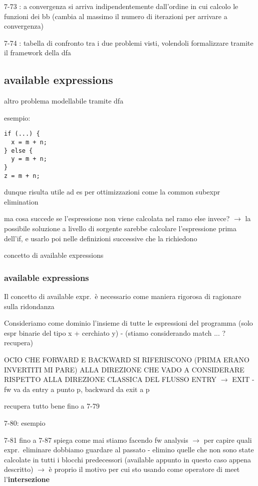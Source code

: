 7-73 : a convergenza si arriva indipendentemente dall'ordine in cui calcolo le funzioni dei bb (cambia al massimo il numero di iterazioni per arrivare a convergenza)

7-74 : tabella di confronto tra i due problemi visti, volendoli formalizzare tramite il framework della dfa

\subsection{available expressions}

altro problema modellabile tramite dfa

esempio:
\begin{lstlisting}
if (...) {
  x = m + n;
} else {
  y = m + n;
}
z = m + n;\end{lstlisting}

dunque risulta utile ad es per ottimizzazioni come la common subexpr elimination

ma cosa succede se l'espressione non viene calcolata nel ramo else invece? $\rightarrow$ la possibile soluzione a livello di sorgente sarebbe calcolare l'espressione prima dell'if, e usarlo poi nelle definizioni successive che la richiedono

concetto di available expressions

\subsubsection{available expressions}

Il concetto di available expr.~\`e necessario come maniera rigorosa di ragionare sulla ridondanza

Consideriamo come dominio l'insieme di tutte le espressioni del programma (solo espr binarie del tipo x + cerchiato y) - (stiamo considerando match ... ? recupera)

OCIO CHE FORWARD E BACKWARD SI RIFERISCONO (PRIMA ERANO INVERTITI MI PARE) ALLA DIREZIONE CHE VADO A CONSIDERARE RISPETTO ALLA DIREZIONE CLASSICA DEL FLUSSO ENTRY $\rightarrow$ EXIT - fw va da entry a punto p, backward da exit a p

recupera tutto bene fino a 7-79

7-80: esempio 

7-81 fino a 7-87 spiega come mai stiamo facendo fw analysis $\rightarrow$ per capire quali expr.~eliminare dobbiamo guardare al passato - elimino quelle che non sono state calcolate in tutti i blocchi predecessori (available appunto in questo caso appena descritto) $\rightarrow$ \`e proprio il motivo per cui sto usando come operatore di meet l'\textbf{intersezione}

